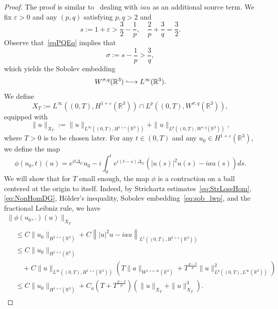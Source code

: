 \documentclass[10pt]{amsart}
\theoremstyle{definition}\newtheorem{defi}[theo]{Definition}\newtheorem{rema}[theo]{Remark}\newtheorem{exam}[theo]{Example}\newtheorem{exem}[theo]{Example}\newtheorem{nota}[theo]{Notation}
\newcommand*\R{\mathbb{R}}
\newcommand*\eps{\varepsilon}
\newcommand{\longhookrightarrow}{\lhook\joinrel\longrightarrow}
\newcommand*{\hookto}{\mathchoice{\longhookrightarrow}{\hookrightarrow}{\hookrightarrow}{\hookrightarrow}}
\begin{document}
\begin{proof}
The proof is similar to~\cite[Proposition~3.1]{BuGeTz04} dealing with $iau$ as an additional source term. We fix $\eps>0$ and any $(p,q)$ satisfying $p,q>2$ and
\begin{equation}\label{eqPQEq}
s := 1 + \eps > \frac 32 - \frac 1p, \quad\frac 2p + \frac 3q = \frac 32.
\end{equation}
Observe that~\eqref{eqPQEq} implies that
\begin{equation*}
\sigma := s - \frac 1p> \frac 3q,
\end{equation*}
which yields the Sobolev embedding
\begin{equation}\label{eq:sob_lwp}
W^{\sigma, q}(\R^3) \hookto L^\infty(\R^3).
\end{equation}
We define
\begin{equation*}
X_{T} := L^\infty\left((0,T), H^{1 + \eps}(\R^3)\right) \cap L^p\left((0,T), W^{\sigma, q}(\R^3)\right),
\end{equation*}
equipped with
\begin{equation*}
\| u \|_{X_T} := \| u \|_{L^\infty\left((0,T), H^{1 + \eps}(\R^3)\right)} + \| u \|_{ L^p\left((0,T), W^{s, q}(\R^3)\right)},
\end{equation*}
where $T>0$ is to be chosen later. For any $t \in (0,T)$ and any $u_0 \in H^{1 + \eps}(\R^3)$, we define the map
\begin{equation*}
\phi(u_0,t)(u) = e^{it\Delta_G} u_0 - i \int_0^t e^{i(t-s)\Delta_G} \left(|u(s)|^{2} u(s) - i a u(s)\right) ds.
\end{equation*}
We will show that for $T$ small enough, the map $\phi$ is a contraction on a ball centered at the origin to itself. Indeed, by Strichartz estimates~\eqref{eq:StrLossHom}, \eqref{eq:NonHomDG}, H{\"o}lder's inequality, Sobolev embedding~\eqref{eq:sob_lwp}, and the fractional Leibniz rule, we have
\begin{multline*}
\| \phi(u_0,.) (u) \|_{X_T}\\
\begin{aligned}
&\leq C \| u_0 \|_{H^{1 + \eps}(\R^3)} + C \left\| |u|^{2} u - i a u \right\|_{L^1\left((0,T), H^{1 + \eps}(\R^3)\right)} \\
& \leq C \| u_0 \|_{H^{1 + \eps}(\R^3)} \\
&\quad + C \| u \|_{L^\infty\left((0,T),H^{1 + \eps}(\R^3)\right)} \left(T\| a \|_{W^{1 +\eps,\infty}(\R^3)} + T^{\frac{p - 2}{p}} \| u \|^{2}_{L^p\left((0,T), L^\infty(\R^3)\right)}\right) \\
&\leq C \| u_0 \|_{H^{1 + \eps}(\R^3)} + C_a\left(T + T^{\frac{p- 2}{p}}\right)\left(\| u \|_{X_T} + \| u \|_{X_T}^{3}\right).

\end{aligned}
\end{multline*}
\end{proof}
\end{document}

